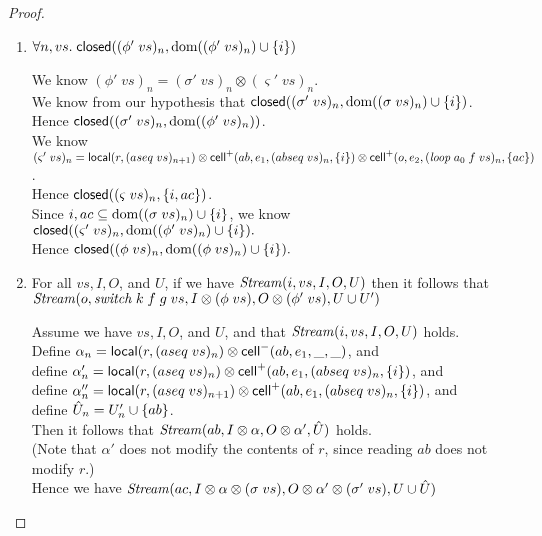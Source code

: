 \begin{proof}
\begin{enumerate}
\item $\forall n, vs.\; \mathsf{closed}({(\phi'\;vs)_n}, {\mbox{dom}({(\phi'\;vs)_n}) \cup \{{i}\}})$ 

  We know $(\phi'\;vs)_n = (\sigma'\;vs)_n \otimes (\varsigma'\;vs)_n$. \\
  We know from our hypothesis that $\mathsf{closed}({(\sigma'\;vs)_n}, {\mbox{dom}({(\sigma\;vs)_n}) \cup \{{i}\}})$. \\
  Hence $\mathsf{closed}({(\sigma'\;vs)_n}, {\mbox{dom}({(\phi'\;vs)_n})})$. \\
  We know $(\varsigma'\;vs)_n = \mathsf{local}({r}, {(aseq\;vs)_{n+1}}) \otimes 
                                \mathsf{cell}^{+}({ab}, {e_1}, {(abseq\;vs)_n}, {\{{i}\}}) \otimes \\
                                \mathsf{cell}^{+}({o}, {e_2}, {(\mathit{loop}\;a_0\;f\;vs)_n}, {\{{ac}\}})$. \\
  Hence $\mathsf{closed}({(\varsigma\;vs)_n}, {\{{i, ac}\}})$. \\
  Since ${i,ac} \subseteq \mbox{dom}({(\sigma\;vs)_n}) \cup \{{i}\}$, 
  we know $\mathsf{closed}({(\varsigma'\;vs)_n}, {\mbox{dom}({(\phi'\;vs)_n}) \cup \{{i}\}}).$ \\
  Hence $\mathsf{closed}({(\phi\;vs)_n}, {\mbox{dom}({(\phi\;vs)_n}) \cup \{{i}\}}).$
 

\item For all $vs, I, O$, and $U$, if we have $\mathit{Stream}(i, vs, I, O, U)$ then it follows that $\mathit{Stream}(o, \mathit{switch}\;k\;f\;g\;vs, I \otimes (\phi\;vs), O \otimes (\phi'\;vs), U \cup U')$
  \begin{tabbedproof}
    Assume we have $vs, I, O$, and $U$, and that $\mathit{Stream}(i, vs, I, O, U)$ holds. \\
    
  \oo Define $\alpha_n = \mathsf{local}({r}, {(aseq\;vs)_n}) \otimes \mathsf{cell}^{-}({ab}, {e_1}, {\_}, {\_})$, and \\
  \oo define $\alpha'_n = \mathsf{local}({r}, {(aseq\;vs)_{n}}) \otimes \mathsf{cell}^{+}({ab}, {e_1}, {(abseq\;vs)_n}, {\{{i}\}})$, and \\
  \oo define $\alpha''_n = \mathsf{local}({r}, {(aseq\;vs)_{n+1}}) \otimes \mathsf{cell}^{+}({ab}, {e_1}, {(abseq\;vs)_n}, {\{{i}\}})$, and \\
  \oo define $\hat{U}_n = U'_n \cup \{{ab}\}$. \\
  \oo Then it follows that $\mathit{Stream}(ab, I \otimes \alpha, O \otimes \alpha', \hat{U})$ holds. \\
  \ooo (Note that $\alpha'$ does not modify the contents of $r$, since reading $ab$ does not modify $r$.) \\
  \oo Hence we have $\mathit{Stream}(ac, I \otimes \alpha \otimes (\sigma\;vs), O \otimes \alpha' \otimes (\sigma'\;vs), U \cup \hat{U})$\\


\end{tabbedproof}
\end{enumerate}
\end{proof}

